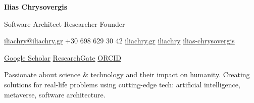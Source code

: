 \documentclass[a4paper,10pt]{article}
\begin{document}
{%
  \fontsize{28}{32}\selectfont\bfseries Ilias Chrysovergis\par
}
\vspace{4pt}
{\fontsize{11}{14}\selectfont\color{textsecondary}%
  Software Architect\hspace{4pt}%
  Researcher\hspace{4pt}%
  Founder%
}

\vspace{10pt}

{\fontsize{9}{13}\selectfont\color{textsecondary}%
  \hspace{4pt}\href{mailto:iliachry@iliachry.gr}{iliachry@iliachry.gr}%
  \hspace{12pt}\hspace{4pt}+30 698 629 30 42%
  \hspace{12pt}\hspace{4pt}\href{https://iliachry.gr}{iliachry.gr}%
  \hspace{12pt}\hspace{4pt}\href{https://github.com/iliachry}{iliachry}%
  \hspace{12pt}\hspace{4pt}\href{https://linkedin.com/in/ilias-chrysovergis}{ilias-chrysovergis}%
}

\vspace{4pt}

{\fontsize{9}{13}\selectfont\color{textsecondary}%
  \hspace{4pt}\href{https://scholar.google.com/citations?user=x5Zq1-QAAAAJ}{Google Scholar}%
  \hspace{12pt}\hspace{4pt}\href{https://www.researchgate.net/profile/Ilias-Chrysovergis}{ResearchGate}%
  \hspace{12pt}\hspace{4pt}\href{https://orcid.org/0000-0002-5434-2175}{ORCID}%
}

\vspace{6pt}
{\fontsize{9.5}{13}\selectfont\color{textsecondary}%
Passionate about science \& technology and their impact on humanity. Creating solutions for real-life problems using cutting-edge tech: artificial intelligence, metaverse, software architecture.%
}
\end{document}

